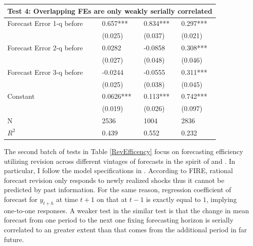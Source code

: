 \documentclass[]{article}
\begin{document}
\begin{table}[ht]
\begin{tabular}{llll}
	\hline 
	\multicolumn{4}{l}{Test 4: Overlapping FEs are only weakly serially correlated}                          \\
	\hline 
	Forecast Error 1-q before           & 0.657***         & 0.834***         & 0.297***       \\
	& (0.025)          & (0.037)          & (0.021)        \\
	Forecast Error 2-q before           & 0.0282           & -0.0858          & 0.308***       \\
	& (0.027)          & (0.048)          & (0.046)        \\
	Forecast Error 3-q before           & -0.0244          & -0.0555          & 0.311***       \\
	& (0.025)          & (0.038)          & (0.045)        \\
	Constant                            & 0.0626***        & 0.113***         & 0.742***       \\
	& (0.019)          & (0.026)          & (0.097)        \\
	\hline 
	N                                   & 2536             & 1004             & 2836           \\
	$R^2$                & 0.439            & 0.552            & 0.232    \\
	\hline      
\end{tabular}
\end{table}


The second batch of tests in Table \ref{RevEfficency} focus on  forecasting efficiency utilizing revision across different vintages of forecasts in the spirit of \citet{nordhaus1987forecasting} and \citet{fuhrer2018intrinsic}. In particular, I follow the model specifications in \citet{fuhrer2018intrinsic}. According to FIRE, rational forecast revision only responds to newly realized shocks thus it cannot be predicted by past information. For the same reason, regression coefficient of forecast for $y_{t+h}$  at time $t+1$ on that at $t-1$ is exactly equal to $1$, implying one-to-one responses.  A weaker test in the similar test is that the change in mean forecast from one period to the next one fixing forecasting horizon is serially correlated to an greater extent than that comes from the additional period in far future. 
\end{document}
